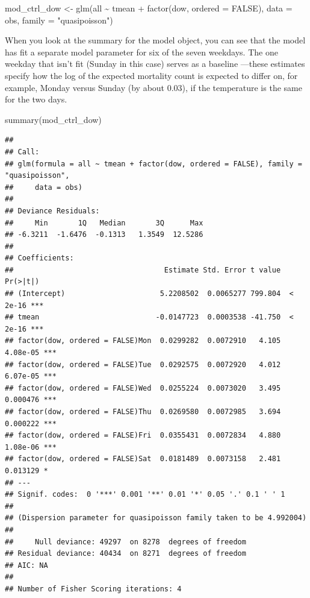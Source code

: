 \documentclass[
]{book}
\newenvironment{Shaded}{\begin{snugshade}}{\end{snugshade}}
\newcommand{\AttributeTok}[1]{\textcolor[rgb]{0.77,0.63,0.00}{#1}}
\newcommand{\ConstantTok}[1]{\textcolor[rgb]{0.00,0.00,0.00}{#1}}
\newcommand{\FunctionTok}[1]{\textcolor[rgb]{0.00,0.00,0.00}{#1}}
\newcommand{\NormalTok}[1]{#1}
\newcommand{\OtherTok}[1]{\textcolor[rgb]{0.56,0.35,0.01}{#1}}
\newcommand{\SpecialCharTok}[1]{\textcolor[rgb]{0.00,0.00,0.00}{#1}}
\newcommand{\StringTok}[1]{\textcolor[rgb]{0.31,0.60,0.02}{#1}}
\begin{document}
\begin{Shaded}
\begin{Highlighting}[]
\NormalTok{mod\_ctrl\_dow }\OtherTok{\textless{}{-}} \FunctionTok{glm}\NormalTok{(all }\SpecialCharTok{\textasciitilde{}}\NormalTok{ tmean }\SpecialCharTok{+} \FunctionTok{factor}\NormalTok{(dow, }\AttributeTok{ordered =} \ConstantTok{FALSE}\NormalTok{), }
                    \AttributeTok{data =}\NormalTok{ obs, }\AttributeTok{family =} \StringTok{"quasipoisson"}\NormalTok{)}
\end{Highlighting}
\end{Shaded}

When you look at the summary for the model object, you can see that the
model has fit a separate model parameter for six of the seven weekdays. The one
weekday that isn't fit (Sunday in this case) serves as a baseline ---these
estimates specify how the log of the expected mortality count is expected to
differ on, for example, Monday versus Sunday (by about 0.03), if the temperature
is the same for the two days.

\begin{Shaded}
\begin{Highlighting}[]
\FunctionTok{summary}\NormalTok{(mod\_ctrl\_dow)}
\end{Highlighting}
\end{Shaded}

\begin{verbatim}
## 
## Call:
## glm(formula = all ~ tmean + factor(dow, ordered = FALSE), family = "quasipoisson", 
##     data = obs)
## 
## Deviance Residuals: 
##     Min       1Q   Median       3Q      Max  
## -6.3211  -1.6476  -0.1313   1.3549  12.5286  
## 
## Coefficients:
##                                   Estimate Std. Error t value Pr(>|t|)    
## (Intercept)                      5.2208502  0.0065277 799.804  < 2e-16 ***
## tmean                           -0.0147723  0.0003538 -41.750  < 2e-16 ***
## factor(dow, ordered = FALSE)Mon  0.0299282  0.0072910   4.105 4.08e-05 ***
## factor(dow, ordered = FALSE)Tue  0.0292575  0.0072920   4.012 6.07e-05 ***
## factor(dow, ordered = FALSE)Wed  0.0255224  0.0073020   3.495 0.000476 ***
## factor(dow, ordered = FALSE)Thu  0.0269580  0.0072985   3.694 0.000222 ***
## factor(dow, ordered = FALSE)Fri  0.0355431  0.0072834   4.880 1.08e-06 ***
## factor(dow, ordered = FALSE)Sat  0.0181489  0.0073158   2.481 0.013129 *  
## ---
## Signif. codes:  0 '***' 0.001 '**' 0.01 '*' 0.05 '.' 0.1 ' ' 1
## 
## (Dispersion parameter for quasipoisson family taken to be 4.992004)
## 
##     Null deviance: 49297  on 8278  degrees of freedom
## Residual deviance: 40434  on 8271  degrees of freedom
## AIC: NA
## 
## Number of Fisher Scoring iterations: 4
\end{verbatim}
\end{document}
